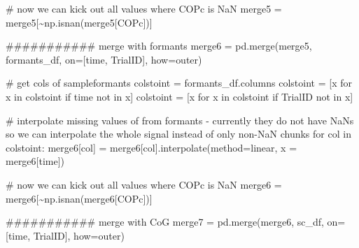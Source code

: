 \documentclass[
  letterpaper,
  DIV=11,
  numbers=noendperiod]{scrreprt}
\newenvironment{Shaded}{\begin{snugshade}}{\end{snugshade}}
\newcommand{\CommentTok}[1]{\textcolor[rgb]{0.37,0.37,0.37}{#1}}
\newcommand{\ControlFlowTok}[1]{\textcolor[rgb]{0.00,0.23,0.31}{#1}}
\newcommand{\KeywordTok}[1]{\textcolor[rgb]{0.00,0.23,0.31}{#1}}
\newcommand{\NormalTok}[1]{\textcolor[rgb]{0.00,0.23,0.31}{#1}}
\newcommand{\OperatorTok}[1]{\textcolor[rgb]{0.37,0.37,0.37}{#1}}
\newcommand{\StringTok}[1]{\textcolor[rgb]{0.13,0.47,0.30}{#1}}
\begin{document}
\begin{Shaded}
\begin{Highlighting}[]
    \CommentTok{\# now we can kick out all values where COPc is NaN}
\NormalTok{    merge5 }\OperatorTok{=}\NormalTok{ merge5[}\OperatorTok{\textasciitilde{}}\NormalTok{np.isnan(merge5[}\StringTok{\textquotesingle{}COPc\textquotesingle{}}\NormalTok{])]}

    \CommentTok{\#\#\#\#\#\#\#\#\#\#\# merge with formants}
\NormalTok{    merge6 }\OperatorTok{=}\NormalTok{ pd.merge(merge5, formants\_df, on}\OperatorTok{=}\NormalTok{[}\StringTok{\textquotesingle{}time\textquotesingle{}}\NormalTok{, }\StringTok{\textquotesingle{}TrialID\textquotesingle{}}\NormalTok{], how}\OperatorTok{=}\StringTok{\textquotesingle{}outer\textquotesingle{}}\NormalTok{)}

    \CommentTok{\# get cols of sampleformants}
\NormalTok{    colstoint }\OperatorTok{=}\NormalTok{ formants\_df.columns}
\NormalTok{    colstoint }\OperatorTok{=}\NormalTok{ [x }\ControlFlowTok{for}\NormalTok{ x }\KeywordTok{in}\NormalTok{ colstoint }\ControlFlowTok{if} \StringTok{\textquotesingle{}time\textquotesingle{}} \KeywordTok{not} \KeywordTok{in}\NormalTok{ x]}
\NormalTok{    colstoint }\OperatorTok{=}\NormalTok{ [x }\ControlFlowTok{for}\NormalTok{ x }\KeywordTok{in}\NormalTok{ colstoint }\ControlFlowTok{if} \StringTok{\textquotesingle{}TrialID\textquotesingle{}} \KeywordTok{not} \KeywordTok{in}\NormalTok{ x]}

    \CommentTok{\# interpolate missing values of from formants {-} currently they do not have NaNs so we can interpolate the whole signal instead of only non{-}NaN chunks}
    \ControlFlowTok{for}\NormalTok{ col }\KeywordTok{in}\NormalTok{ colstoint:}
\NormalTok{        merge6[col] }\OperatorTok{=}\NormalTok{ merge6[col].interpolate(method}\OperatorTok{=}\StringTok{\textquotesingle{}linear\textquotesingle{}}\NormalTok{, x }\OperatorTok{=}\NormalTok{ merge6[}\StringTok{\textquotesingle{}time\textquotesingle{}}\NormalTok{])}

    \CommentTok{\# now we can kick out all values where COPc is NaN}
\NormalTok{    merge6 }\OperatorTok{=}\NormalTok{ merge6[}\OperatorTok{\textasciitilde{}}\NormalTok{np.isnan(merge6[}\StringTok{\textquotesingle{}COPc\textquotesingle{}}\NormalTok{])]}

    \CommentTok{\#\#\#\#\#\#\#\#\#\#\# merge with CoG}
\NormalTok{    merge7 }\OperatorTok{=}\NormalTok{ pd.merge(merge6, sc\_df, on}\OperatorTok{=}\NormalTok{[}\StringTok{\textquotesingle{}time\textquotesingle{}}\NormalTok{, }\StringTok{\textquotesingle{}TrialID\textquotesingle{}}\NormalTok{], how}\OperatorTok{=}\StringTok{\textquotesingle{}outer\textquotesingle{}}\NormalTok{)}


\end{Highlighting}
\end{Shaded}
\end{document}
